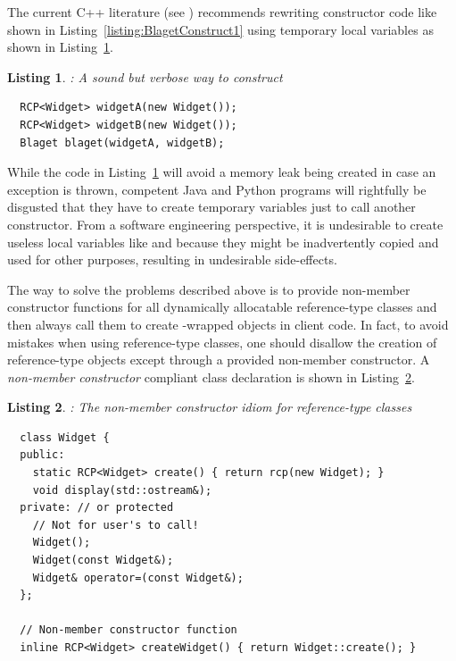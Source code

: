 \documentclass[pdf,ps2pdf,11pt]{SANDreport}
\newtheorem{listing}{Listing}
\begin{document}
The current C++ literature (see {}\cite[Item
13]{C++CodingStandards05}) recommends rewriting constructor code like
shown in Listing~\ref{listing:BlagetConstruct1} using temporary local
variables as shown in Listing~\ref{listing:BlagetConstruct2}.

\begin{listing}: A sound but verbose way to construct \\
\label{listing:BlagetConstruct2}
{\small\begin{verbatim}
  RCP<Widget> widgetA(new Widget());
  RCP<Widget> widgetB(new Widget());
  Blaget blaget(widgetA, widgetB);
\end{verbatim}}
\end{listing}

While the code in Listing~\ref{listing:BlagetConstruct2} will avoid a
memory leak being created in case an exception is thrown, competent
Java and Python programs will rightfully be disgusted that they have
to create temporary variables just to call another constructor.  From
a software engineering perspective, it is undesirable to create
useless local variables like {} and {}
because they might be inadvertently copied and used for other
purposes, resulting in undesirable side-effects.

The way to solve the problems described above is to provide non-member
constructor functions for all dynamically allocatable reference-type
classes and then always call them to create {}-wrapped
objects in client code.  In fact, to avoid mistakes when using
reference-type classes, one should disallow the creation of
reference-type objects except through a provided non-member
constructor.  A {}\textit{non-member constructor} compliant
{} class declaration is shown in
Listing~\ref{listing:WidgetNonmemberConstructor}.

{}\begin{listing}: The non-member constructor idiom for reference-type
classes
\label{listing:WidgetNonmemberConstructor}
{\small\begin{verbatim}
  class Widget {
  public:
    static RCP<Widget> create() { return rcp(new Widget); }
    void display(std::ostream&);
  private: // or protected
    // Not for user's to call!
    Widget();
    Widget(const Widget&);
    Widget& operator=(const Widget&);
  };

  // Non-member constructor function
  inline RCP<Widget> createWidget() { return Widget::create(); }
\end{verbatim}}
\end{listing}
\end{document}
